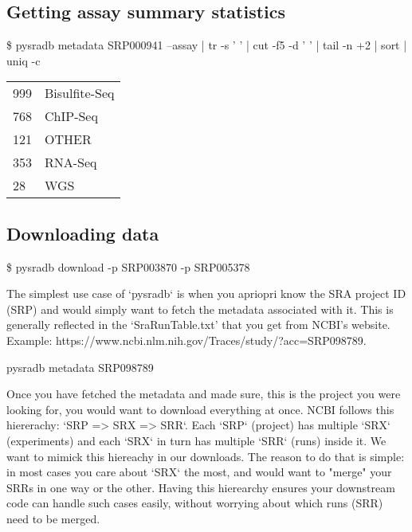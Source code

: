\documentclass[9pt,a4paper]{extarticle}
\newenvironment{allintypewriter}{\ttfamily}{\par}
\begin{document}
\subsection*{Getting assay summary statistics}

\begin{allintypewriter}
\$ pysradb metadata SRP000941 --assay  | tr -s '  ' | cut -f5 -d ' ' | tail -n +2 | sort | uniq -c
\begin{table}[H]
    \begin{tabular}{ll}
        999  & Bisulfite-Seq\\
        768 & ChIP-Seq\\
        121 & OTHER\\
        353 & RNA-Seq\\
        28 & WGS\\
    \end{tabular}
\end{table}
\end{allintypewriter}

\subsection*{Downloading data}

\begin{allintypewriter}
\$  pysradb download -p SRP003870 -p SRP005378
\end{allintypewriter}







The simplest use case of `pysradb` is when you apriopri know the SRA project ID 
(SRP) and would simply want to fetch the metadata associated with it. This is
generally reflected in the `SraRunTable.txt' that you get from NCBI's website.
Example: https://www.ncbi.nlm.nih.gov/Traces/study/?acc=SRP098789.

\begin{allintypewriter}
pysradb metadata SRP098789
\end{allintypewriter}

Once you have fetched the metadata and made sure, this is the project you were 
looking for, you would want to download everything at once. NCBI follows this 
hiererachy: `SRP => SRX => SRR`. Each `SRP` (project) has multiple `SRX` 
(experiments) and each `SRX` in turn has multiple `SRR` (runs) inside it.
We want to mimick this hiereachy in our downloads. The reason to do that is simple:
in most cases you care about `SRX` the most, and would want to "merge" your SRRs
in one way or the other. Having this hierearchy ensures your downstream code
can handle such cases easily, without worrying about which runs (SRR) need to
be merged.
\end{document}
